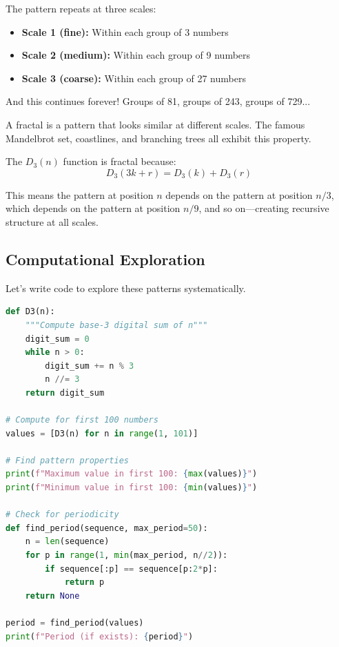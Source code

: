 The pattern repeats at three scales:
\begin{itemize}
\item \textbf{Scale 1 (fine):} Within each group of 3 numbers
\item \textbf{Scale 2 (medium):} Within each group of 9 numbers  
\item \textbf{Scale 3 (coarse):} Within each group of 27 numbers
\end{itemize}

And this continues forever! Groups of 81, groups of 243, groups of 729...

\begin{keyidea}
A fractal is a pattern that looks similar at different scales. The famous Mandelbrot set, coastlines, and branching trees all exhibit this property.

The $D_3(n)$ function is fractal because:
$$D_3(3k + r) = D_3(k) + D_3(r)$$

This means the pattern at position $n$ depends on the pattern at position $n/3$, which depends on the pattern at position $n/9$, and so on—creating recursive structure at all scales.
\end{keyidea}

\subsection{Computational Exploration}
\label{subsec:computational-exploration}

Let's write code to explore these patterns systematically.

\begin{lstlisting}[language=Python, caption=Computing $D_3(n)$ efficiently]
def D3(n):
    """Compute base-3 digital sum of n"""
    digit_sum = 0
    while n > 0:
        digit_sum += n % 3
        n //= 3
    return digit_sum

# Compute for first 100 numbers
values = [D3(n) for n in range(1, 101)]

# Find pattern properties
print(f"Maximum value in first 100: {max(values)}")
print(f"Minimum value in first 100: {min(values)}")

# Check for periodicity
def find_period(sequence, max_period=50):
    n = len(sequence)
    for p in range(1, min(max_period, n//2)):
        if sequence[:p] == sequence[p:2*p]:
            return p
    return None

period = find_period(values)
print(f"Period (if exists): {period}")
\end{lstlisting}

